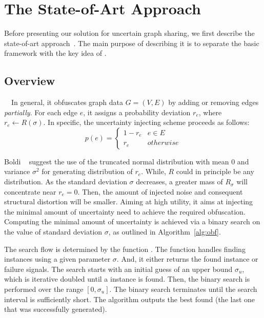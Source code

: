 \section{The State-of-Art Approach}
Before presenting our solution {\methodName} for uncertain graph sharing, we first describe the state-of-art approach~\cite{Boldi_Injecting_2012}. The main purpose of describing it is to separate the basic framework with the key idea of {\methodName}. 

\subsection{Overview}~~In general, it obfuscates graph data $G=(V,E)$ by adding or removing edges \emph{partially}. For each edge $e$, it assigns a probability deviation $r_{e}$, where $r_{e} \leftarrow R(\sigma)$. In specific, the uncertainty injecting scheme proceeds as follows:
\begin{equation}
	p(e) =
	\begin{cases}
		 1-r_{e}  & e \in E \\
		 r_{e}    & otherwise 
	\end{cases}
	\label{eq:inject}
\end{equation}

Boldi {\etal}~\cite{Boldi_Injecting_2012} suggest the use of the truncated normal distribution with mean 0 and variance $\sigma^2$ for generating distribution of $r_{e}$. While, $R$ could in principle be any distribution. As the standard deviation $\sigma$ decreases, a greater mass of $R_{\sigma}$ will concentrate near $r_{e}=0$.  Then, the amount of injected noise and consequent structural distortion  will be smaller. Aiming at high utility, it aims at injecting the minimal amount of uncertainty need to achieve the required obfuscation. 
Computing the minimal amount of uncertainty is achieved via a binary search on the value of standard deviation $\sigma$, as outlined in Algorithm~\ref{alg:obf}. 


The search flow is determined by the function {\genobf}. The function {\genobf} handles finding {\keobf} instances using a given parameter $\sigma$. And, it either returns the found {\keobf} instance or failure signals.
The search starts with an initial guess of an upper bound $\sigma_{u}$, which is iterative doubled until a {\keobf} instance is found. Then, the binary search is performed over the range $[0,\sigma_{u}]$. The binary search terminates until the search interval is sufficiently short. The algorithm outputs the best {\keobf} found (the last one that was successfully generated).

